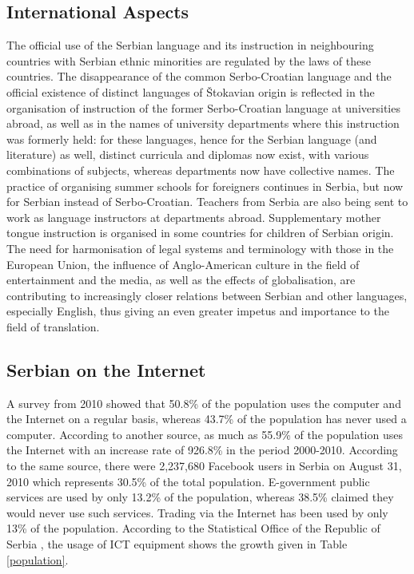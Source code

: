 \begin{multicols}{2}
 \subsection {International Aspects}
    
The official use of the Serbian language and its instruction in neighbouring countries with Serbian ethnic minorities are regulated by the laws of these countries. 
The disappearance of the common Serbo-Croatian language and the official existence of distinct languages of Štokavian origin is reflected in the organisation of instruction of the former Serbo-Croatian language at universities abroad, as well as in the names of university departments where this instruction was formerly held: for these languages, hence for the Serbian language (and literature) as well, distinct curricula and diplomas now exist, with various combinations of subjects, whereas departments now have collective names.
The practice of organising summer schools for foreigners continues in Serbia, but now for Serbian instead of Serbo-Croatian. Teachers from Serbia are also being sent to work as language instructors at departments abroad. 
Supplementary mother tongue instruction is organised in some countries for children of Serbian origin. 
The need for harmonisation of legal systems and terminology with those in the European Union, the influence of Anglo-American culture in the field of entertainment and the media, as well as the effects of globalisation, are contributing to increasingly closer relations between Serbian and other languages, especially English, thus giving an even greater impetus and importance to the field of translation.
 
 \subsection {Serbian on the Internet}

A survey \cite{PKEY204} from 2010 showed that 50.8\% of the population uses the computer and the Internet on a regular basis, whereas 43.7\% of the population has never used a computer. According to another source, \cite{EUROPA2} as much as 55.9\% of the population uses the Internet with an increase rate of 926.8\% in the period 2000-2010. According to the same source, there were 2,237,680 Facebook users in Serbia on August 31, 2010 which represents 30.5\% of the total population. E-government public services are used by only 13.2\% of the population, whereas 38.5\% claimed they would never use such services. Trading via the Internet has been used by only 13\% of the population.  According to the Statistical Office of the Republic of Serbia \cite{WEBRZS}, the usage of ICT equipment shows the growth given in Table \ref{population}.


\end{multicols}
